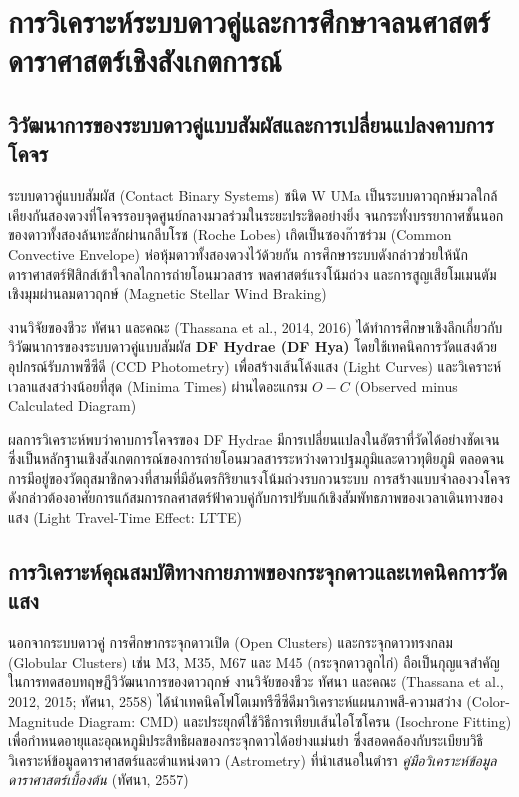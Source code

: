 \section{การวิเคราะห์ระบบดาวคู่และการศึกษาจลนศาสตร์ดาราศาสตร์เชิงสังเกตการณ์}

\subsection{วิวัฒนาการของระบบดาวคู่แบบสัมผัสและการเปลี่ยนแปลงคาบการโคจร}
ระบบดาวคู่แบบสัมผัส (Contact Binary Systems) ชนิด W UMa เป็นระบบดาวฤกษ์มวลใกล้เคียงกันสองดวงที่โคจรรอบจุดศูนย์กลางมวลร่วมในระยะประชิดอย่างยิ่ง จนกระทั่งบรรยากาศชั้นนอกของดาวทั้งสองล้นทะลักผ่านกลีบโรช (Roche Lobes) เกิดเป็นซองก๊าซร่วม (Common Convective Envelope) ห่อหุ้มดาวทั้งสองดวงไว้ด้วยกัน การศึกษาระบบดังกล่าวช่วยให้นักดาราศาสตร์ฟิสิกส์เข้าใจกลไกการถ่ายโอนมวลสาร พลศาสตร์แรงโน้มถ่วง และการสูญเสียโมเมนตัมเชิงมุมผ่านลมดาวฤกษ์ (Magnetic Stellar Wind Braking)

งานวิจัยของชีวะ ทัศนา และคณะ (Thassana et al., 2014, 2016) ได้ทำการศึกษาเชิงลึกเกี่ยวกับวิวัฒนาการของระบบดาวคู่แบบสัมผัส \textbf{DF Hydrae (DF Hya)} โดยใช้เทคนิคการวัดแสงด้วยอุปกรณ์รับภาพซีซีดี (CCD Photometry) เพื่อสร้างเส้นโค้งแสง (Light Curves) และวิเคราะห์เวลาแสงสว่างน้อยที่สุด (Minima Times) ผ่านไดอะแกรม $O-C$ (Observed minus Calculated Diagram) 

ผลการวิเคราะห์พบว่าคาบการโคจรของ DF Hydrae มีการเปลี่ยนแปลงในอัตราที่วัดได้อย่างชัดเจน ซึ่งเป็นหลักฐานเชิงสังเกตการณ์ของการถ่ายโอนมวลสารระหว่างดาวปฐมภูมิและดาวทุติยภูมิ ตลอดจนการมีอยู่ของวัตถุสมาชิกดวงที่สามที่มีอันตรกิริยาแรงโน้มถ่วงรบกวนระบบ การสร้างแบบจำลองวงโคจรดังกล่าวต้องอาศัยการแก้สมการกลศาสตร์ฟ้าควบคู่กับการปรับแก้เชิงสัมพัทธภาพของเวลาเดินทางของแสง (Light Travel-Time Effect: LTTE)

\subsection{การวิเคราะห์คุณสมบัติทางกายภาพของกระจุกดาวและเทคนิคการวัดแสง}
นอกจากระบบดาวคู่ การศึกษากระจุกดาวเปิด (Open Clusters) และกระจุกดาวทรงกลม (Globular Clusters) เช่น M3, M35, M67 และ M45 (กระจุกดาวลูกไก่) ถือเป็นกุญแจสำคัญในการทดสอบทฤษฎีวิวัฒนาการของดาวฤกษ์ งานวิจัยของชีวะ ทัศนา และคณะ (Thassana et al., 2012, 2015; ทัศนา, 2558) ได้นำเทคนิคโฟโตเมทรีซีซีดีมาวิเคราะห์แผนภาพสี-ความสว่าง (Color-Magnitude Diagram: CMD) และประยุกต์ใช้วิธีการเทียบเส้นไอโซโครน (Isochrone Fitting) เพื่อกำหนดอายุและอุณหภูมิประสิทธิผลของกระจุกดาวได้อย่างแม่นยำ ซึ่งสอดคล้องกับระเบียบวิธีวิเคราะห์ข้อมูลดาราศาสตร์และตำแหน่งดาว (Astrometry) ที่นำเสนอในตำรา \textit{คู่มือวิเคราะห์ข้อมูลดาราศาสตร์เบื้องต้น} (ทัศนา, 2557) 

